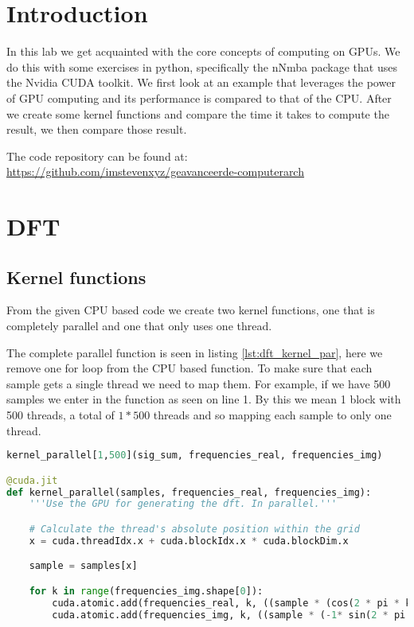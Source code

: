 
\section{Introduction}
\label{sec:introduction}
In this lab we get acquainted with the core concepts of computing on GPUs. We do this with some exercises in python, specifically the nNmba package that uses the Nvidia CUDA toolkit. We first look at an example that leverages the power of GPU computing and its performance is compared to that of the CPU. After we create some kernel functions and compare the time it takes to compute the result, we then compare those result.

The code repository can be found at: \\
\url{https://github.com/imstevenxyz/geavanceerde-computerarch}

\section{DFT}
\label{sec:dft}

\subsection{Kernel functions}
\label{subsec:kernel_functions}

From the given CPU based code we create two kernel functions, one that is completely parallel and one that only uses one thread.

The complete parallel function is seen in listing \ref{lst:dft_kernel_par}, here we remove one for loop from the CPU based function. To make sure that each sample gets a single thread we need to map them. For example, if we have 500 samples we enter \code{[1,500]} in the function as seen on line 1. By this we mean 1 block with 500 threads, a total of $1*500$ threads and so mapping each sample to only one thread.

\begin{lstlisting}[language=Python,caption={DFT parallel kernel},label={lst:dft_kernel_par}]
kernel_parallel[1,500](sig_sum, frequencies_real, frequencies_img)

@cuda.jit
def kernel_parallel(samples, frequencies_real, frequencies_img):
    '''Use the GPU for generating the dft. In parallel.'''

    # Calculate the thread's absolute position within the grid
    x = cuda.threadIdx.x + cuda.blockIdx.x * cuda.blockDim.x

    sample = samples[x]

    for k in range(frequencies_img.shape[0]):
        cuda.atomic.add(frequencies_real, k, ((sample * (cos(2 * pi * k * x / N)))))
        cuda.atomic.add(frequencies_img, k, ((sample * (-1* sin(2 * pi * k * x / N) ))))
\end{lstlisting}

